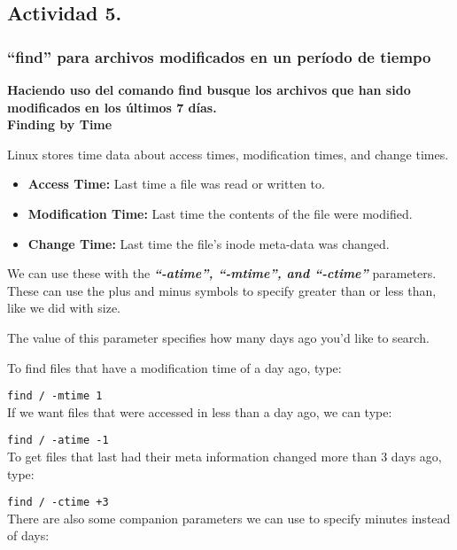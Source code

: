 \documentclass[a4paper,11pt,spanish]{article} %
\begin{document}
\subsection{Actividad 5.}

\subsubsection{``find'' para archivos modificados en un período de tiempo}

\textbf{Haciendo uso del comando find busque los archivos que han sido modificados en 
los últimos 7 días.}\\

\textbf{Finding by Time}

Linux stores time data about access times, modification times, and change times.

\begin{itemize}
\item \textbf{Access Time:} Last time a file was read or written to.

\item \textbf{Modification Time:} Last time the contents of the file were modified.

\item \textbf{Change Time:} Last time the file's inode meta-data was changed.
\end{itemize}


We can use these with the \textbf{\emph{``-atime'', ``-mtime'', and ``-ctime''}} parameters. 
These can use the plus and minus symbols to specify greater than or less than, like we did with size.

The value of this parameter specifies how many days ago you'd like to search.

To find files that have a modification time of a day ago, type:

\texttt{find / -mtime 1}\\

If we want files that were accessed in less than a day ago, we can type:

\texttt{find / -atime -1}\\

To get files that last had their meta information changed more than 3 days ago, type:

\texttt{find / -ctime +3}\\

There are also some companion parameters we can use to specify minutes instead of days:
\end{document}
